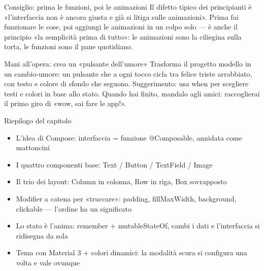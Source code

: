 \begin{tcbinfo}{Consiglio: prima le funzioni, poi le animazioni}
Il difetto tipico dei principianti è «l'interfaccia non è ancora giusta e già si litiga sulle animazioni». Prima fai funzionare le cose, poi aggiungi le animazioni in un colpo solo — è anche il principio «la semplicità prima di tutto»: le animazioni sono la ciliegina sulla torta, le funzioni sono il pane quotidiano.

\end{tcbinfo}

\begin{tcbpractice}{Mani all'opera: crea un «pulsante dell'umore»}
Trasforma il progetto modello in un cambio-umore: un pulsante che a ogni tocco cicla tra felice triste arrabbiato, con testo e colore di sfondo che seguono. Suggerimento: usa when per scegliere testi e colori in base allo stato. Quando hai finito, mandalo agli amici: raccoglierai il primo giro di «wow, sai fare le app!».

\end{tcbpractice}

\begin{tcbsummary}{Riepilogo del capitolo}
\begin{itemize}
  \item L'idea di Compose: interfaccia = funzione @Composable, annidata come mattoncini
  \item I quattro componenti base: Text / Button / TextField / Image
  \item Il trio dei layout: Column in colonna, Row in riga, Box sovrapposto
  \item Modifier a catena per «truccare»: padding, fillMaxWidth, background, clickable — l'ordine ha un significato
  \item Lo stato è l'anima: remember + mutableStateOf, cambi i dati e l'interfaccia si ridisegna da sola
  \item Tema con Material 3 + colori dinamici: la modalità scura si configura una volta e vale ovunque
\end{itemize}

\end{tcbsummary}
